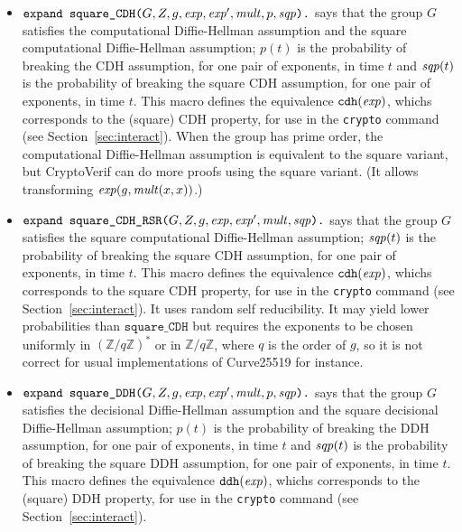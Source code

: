 \documentclass{article}
\begin{document}
\begin{itemize}
\begin{itemize}
\begin{itemize}
     \item
       $\texttt{expand\ square\_CDH(}G, Z, g, \mathit{exp}, \mathit{exp}',
       \mathit{mult}, p, \mathit{sqp}\texttt{).}$
       says that the group $G$ satisfies the computational
       Diffie-Hellman assumption and the square computational
       Diffie-Hellman assumption; $p(t)$ is the probability of
       breaking the CDH assumption, for one pair of exponents, in time
       $t$ and $\mathit{sqp}(t)$ is the probability of breaking the square
       CDH assumption, for one pair of exponents, in time $t$.  This
       macro defines the equivalence $\texttt{cdh}(\mathit{exp})$, whichs
       corresponds to the (square) CDH property, for use in the
       \texttt{crypto} command (see Section~\ref{sec:interact}). When
       the group has prime order, the computational Diffie-Hellman
       assumption is equivalent to the square variant, but CryptoVerif
       can do more proofs using the square variant. (It allows
       transforming $\mathit{exp}(g, \mathit{mult}(x,x))$.)

     \item
       $\texttt{expand\ square\_CDH\_RSR(}G, Z, g, \mathit{exp},
       \mathit{exp}', \mathit{mult}, \mathit{sqp}\texttt{).}$
       says that the group $G$ satisfies the square computational
       Diffie-Hellman assumption; $\mathit{sqp}(t)$ is the probability of
       breaking the square CDH assumption, for one pair of exponents,
       in time $t$.  This macro defines the equivalence
       $\texttt{cdh}(\mathit{exp})$, whichs corresponds to the square CDH
       property, for use in the \texttt{crypto} command (see
       Section~\ref{sec:interact}). It uses random self
       reducibility. It may yield lower probabilities than
       $\texttt{square\_CDH}$ but requires the exponents to be chosen
       uniformly in $(\mathbb{Z}/q\mathbb{Z})^*$ or in $\mathbb{Z}/q\mathbb{Z}$, where $q$ is the order
       of $g$, so it is not correct for usual implementations of Curve25519 for instance.

     \item
       $\texttt{expand\ square\_DDH(}G, Z, g, \mathit{exp}, \mathit{exp}',
       \mathit{mult}, p, \mathit{sqp}\texttt{).}$
       says that the group $G$ satisfies the decisional Diffie-Hellman
       assumption and the square decisional Diffie-Hellman assumption;
       $p(t)$ is the probability of breaking the DDH assumption, for
       one pair of exponents, in time $t$ and $\mathit{sqp}(t)$ is the
       probability of breaking the square DDH assumption, for one pair
       of exponents, in time $t$.  This macro defines the equivalence
       $\texttt{ddh}(\mathit{exp})$, whichs corresponds to the (square)
       DDH property, for use in the \texttt{crypto} command (see
       Section~\ref{sec:interact}).


\end{itemize}
\end{itemize}
\end{itemize}
\end{document}
